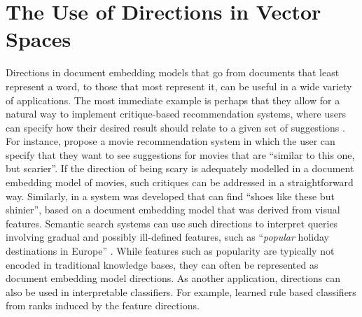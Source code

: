 

 


\section{The Use of Directions in Vector Spaces}

Directions in document embedding models that go from documents that least represent a word, to those that most represent it, can be useful in a wide variety of applications. The most immediate example is perhaps that they allow for a natural way to implement critique-based recommendation systems, where users can specify how their desired result should relate to a given set of suggestions \cite{Viappiani2006}. For instance, \cite{Vig2014} propose a movie recommendation system in which the user can specify that they want to see suggestions for movies that are ``similar to this one, but scarier''. If the direction of being scary is adequately modelled in a document embedding model of movies, such critiques can be addressed in a straightforward way. Similarly, in \cite{Kovashka} a system was developed that can find ``shoes like these but shinier'', based on a document embedding model that was derived from visual features. Semantic search systems can use such directions to interpret queries involving gradual and possibly ill-defined features, such as ``\emph{popular} holiday destinations in Europe'' \cite{Jameel}. While features such as popularity are typically not encoded in traditional knowledge bases, they can often be represented as document embedding model directions.  As another application, directions can also be used in interpretable classifiers. For example, \cite{Derrac2015} learned rule based classifiers from ranks induced by the feature directions.

